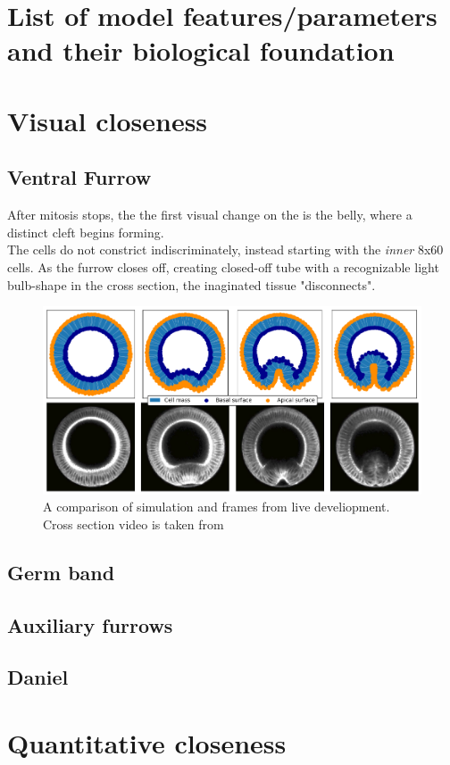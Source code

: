 \section{List of model features/parameters and their biological foundation}
\section{Visual closeness}
\subsection{Ventral Furrow}
After mitosis stops, the the first visual change on the is the belly, where a distinct cleft begins forming. \\

The cells do not constrict indiscriminately, instead starting with the \textit{inner} 8x60 cells. As the furrow closes off, creating closed-off tube with a recognizable light bulb-shape in the cross section, the inaginated tissue "disconnects".

\begin{figure}[H]
    \centering
    \includegraphics[width=0.7\linewidth]{chapters/Results/figures/VF_comparison.png}
    \caption{A comparison of simulation and frames from live develiopment. Cross section video is taken from \cite{}}
    \label{fig:enter-label}
\end{figure}
\subsection{Germ band}
\subsection{Auxiliary furrows}
\subsection{Daniel}
\section{Quantitative closeness}
